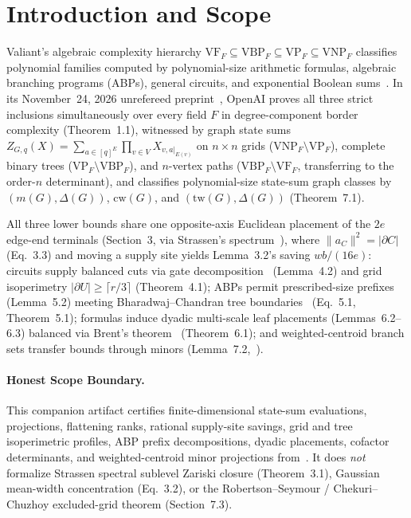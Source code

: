 \documentclass[10pt,twocolumn]{article}
\begin{document}
\section{Introduction and Scope}
Valiant's algebraic complexity hierarchy $\mathrm{VF}_F \subseteq \mathrm{VBP}_F \subseteq \mathrm{VP}_F \subseteq \mathrm{VNP}_F$ classifies polynomial families computed by polynomial-size arithmetic formulas, algebraic branching programs (ABPs), general circuits, and exponential Boolean sums~\cite{valiant1979completeness,malod2008characterizing}. In its November~24, 2026 unrefereed preprint~\cite{openai2026valianthier}, OpenAI proves all three strict inclusions simultaneously over every field $F$ in degree-component border complexity (Theorem~1.1), witnessed by graph state sums $Z_{G,q}(X) = \sum_{a\in[q]^E}\prod_{v\in V} X_{v,a|_{E(v)}}$ on $n\times n$ grids ($\mathrm{VNP}_F \setminus \mathrm{VP}_F$), complete binary trees ($\mathrm{VP}_F \setminus \mathrm{VBP}_F$), and $n$-vertex paths ($\mathrm{VBP}_F \setminus \mathrm{VF}_F$, transferring to the order-$n$ determinant), and classifies polynomial-size state-sum graph classes by $(m(G),\Delta(G))$, $\mathrm{cw}(G)$, and $(\mathrm{tw}(G),\Delta(G))$ (Theorem~7.1).

All three lower bounds share one opposite-axis Euclidean placement of the $2e$ edge-end terminals (Section~3, via Strassen's spectrum~\cite{strassen1988asymptotic,openai2026tensorspectrum}), where $\|a_C\|^2 = |\partial C|$ (Eq.~3.3) and moving a supply site yields Lemma~3.2's saving $wb/(16e)$: circuits supply balanced cuts via gate decomposition~\cite{valiant1983fast} (Lemma~4.2) and grid isoperimetry $|\partial U|\ge\lceil r/3\rceil$ (Theorem~4.1); ABPs permit prescribed-size prefixes (Lemma~5.2) meeting Bharadwaj--Chandran tree boundaries~\cite{bharadwaj2009bounds} (Eq.~5.1, Theorem~5.1); formulas induce dyadic multi-scale leaf placements (Lemmas~6.2--6.3) balanced via Brent's theorem~\cite{brent1974parallel} (Theorem~6.1); and weighted-centroid branch sets transfer bounds through minors (Lemma~7.2,~\cite{chekuri2016polynomial}).

\paragraph{Honest Scope Boundary.}
This companion artifact certifies finite-dimensional state-sum evaluations, projections, flattening ranks, rational supply-site savings, grid and tree isoperimetric profiles, ABP prefix decompositions, dyadic placements, cofactor determinants, and weighted-centroid minor projections from~\cite{openai2026valianthier}. It does \emph{not} formalize Strassen spectral sublevel Zariski closure (Theorem~3.1), Gaussian mean-width concentration (Eq.~3.2), or the Robertson--Seymour / Chekuri--Chuzhoy excluded-grid theorem (Section~7.3).
\end{document}
